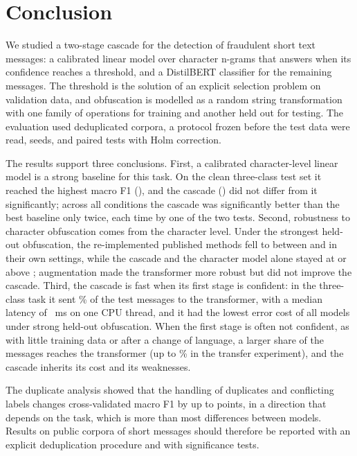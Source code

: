 \section{Conclusion}\label{sec:conclusion}

We studied a two-stage cascade for the detection of fraudulent short text messages: a calibrated linear model over character n-grams that answers when its confidence reaches a threshold, and a DistilBERT classifier for the remaining messages. The threshold is the solution of an explicit selection problem on validation data, and obfuscation is modelled as a random string transformation with one family of operations for training and another held out for testing. The evaluation used deduplicated corpora, a protocol frozen before the test data were read,  seeds, and paired tests with Holm correction.

The results support three conclusions. First, a calibrated character-level linear model is a strong baseline for this task. On the clean three-class test set it reached the highest macro F1 (), and the cascade () did not differ from it significantly; across all conditions the cascade was significantly better than the best baseline only twice, each time by one of the two tests. Second, robustness to character obfuscation comes from the character level. Under the strongest held-out obfuscation, the re-implemented published methods fell to between  and  in their own settings, while the cascade and the character model alone stayed at or above ; augmentation made the transformer more robust but did not improve the cascade. Third, the cascade is fast when its first stage is confident: in the three-class task it sent \% of the test messages to the transformer, with a median latency of ~ms on one CPU thread, and it had the lowest error cost of all models under strong held-out obfuscation. When the first stage is often not confident, as with little training data or after a change of language, a larger share of the messages reaches the transformer (up to \% in the transfer experiment), and the cascade inherits its cost and its weaknesses.

The duplicate analysis showed that the handling of duplicates and conflicting labels changes cross-validated macro F1 by up to  points, in a direction that depends on the task, which is more than most differences between models. Results on public corpora of short messages should therefore be reported with an explicit deduplication procedure and with significance tests.

